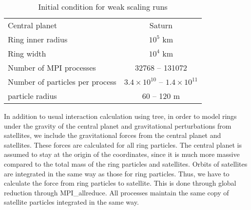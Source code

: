 \documentclass[sigconf]{acmart}
\begin{document}



\begin{table}
 \caption{Initial condition for weak scaling runs}
 \label{tab:initialcoditions}
 \begin{tabular}{lc}
   \toprule
   Central planet & Saturn\\
   Ring inner radius & $10^5$ km\\
   Ring width        & $10^4$ km\\
   Number of MPI processes & 32768 -- 131072 \\
   Number of particles per process & $3.4 \times 10^{10} $ -- $1.4 \times 10^{11}$  \\
   particle radius & 60 -- 120 m\\
 \bottomrule
\end{tabular}
\end{table}

In addition to usual interaction calculation using tree, in order to
model rings under the gravity of the central planet and gravitational
perturbations from satellites, we include the gravitational forces from
the central planet and satellites. These forces are calculated for all
ring particles. The central planet is assumed to
stay at the origin of the coordinates, since it is much more massive
compared to the total mass of the ring particles and
satellites. Orbits of satellites are integrated in the same way as
those for ring particles. Thus, we have to calculate the force from
ring particles to satellite. This is done through global reduction
through MPI\_allreduce. All processes maintain the same copy of
satellite particles integrated in the same way.
\end{document}
